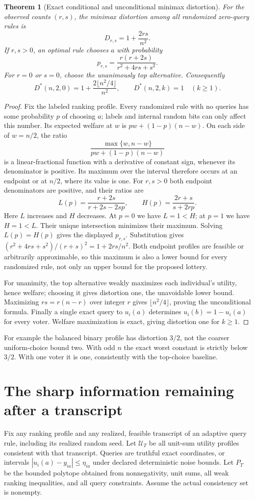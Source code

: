 \documentclass[11pt]{article}
\newtheorem{theorem}{Theorem}
\theoremstyle{remark}
\begin{document}
\begin{theorem}[Exact conditional and unconditional minimax distortion]
For the observed counts $(r,s)$, the minimax distortion among all
randomized zero-query rules is
\[
 D_{r,s}=1+\frac{2rs}{n^2}.
\]
If $r,s>0$, an optimal rule chooses $a$ with probability
\[
 p_{r,s}=\frac{r(r+2s)}{r^2+4rs+s^2}.
\]
For $r=0$ or $s=0$, choose the unanimously top alternative.
Consequently
\[
 D^*(n,2,0)=1+\frac{2\lfloor n^2/4\rfloor}{n^2},
 \qquad D^*(n,2,k)=1\quad(k\geq1).
\]
\end{theorem}
\begin{proof}
Fix the labeled ranking profile. Every randomized rule with no queries
has some probability $p$ of choosing $a$; labels and internal random
bits can only affect this number. Its expected welfare at $w$ is
$pw+(1-p)(n-w)$. On each side of $w=n/2$, the ratio
\[
 \frac{\max\{w,n-w\}}{pw+(1-p)(n-w)}
\]
is a linear-fractional function with a derivative of constant sign,
whenever its denominator is positive. Its maximum over the interval
therefore occurs at an endpoint or at $n/2$, where its value is one.
For $r,s>0$ both endpoint denominators are positive, and their ratios are
\[
 L(p)=\frac{r+2s}{r+2s-2sp},\qquad
 H(p)=\frac{2r+s}{s+2rp}.
\]
Here $L$ increases and $H$ decreases. At $p=0$ we have $L=1<H$;
at $p=1$ we have $H=1<L$. Their unique intersection minimizes their
maximum. Solving $L(p)=H(p)$ gives the displayed $p_{r,s}$.
Substitution gives $(r^2+4rs+s^2)/(r+s)^2=1+2rs/n^2$.
Both endpoint profiles are feasible or arbitrarily approximable, so
this maximum is also a lower bound for every randomized rule, not only
an upper bound for the proposed lottery.

For unanimity, the top alternative weakly maximizes each individual's
utility, hence welfare; choosing it gives distortion one, the unavoidable
lower bound. Maximizing $rs=r(n-r)$ over integer $r$ gives
$\lfloor n^2/4\rfloor$, proving the unconditional formula. Finally a
single exact query to $u_i(a)$ determines $u_i(b)=1-u_i(a)$ for every
voter. Welfare maximization is exact, giving distortion one for $k\geq1$.
\end{proof}

For example the balanced binary profile has distortion $3/2$, not the
coarser uniform-choice bound two. With odd $n$ the exact worst constant
is strictly below $3/2$. With one voter it is one, consistently with the
top-choice baseline.

\section{The sharp information remaining after a transcript}
Fix any ranking profile and any realized, feasible transcript of an
adaptive query rule, including its realized random seed. Let
$\mathcal U_T$ be all unit-sum utility profiles consistent with that
transcript. Queries are truthful exact coordinates, or intervals
$|u_i(a)-y_{ia}|\leq\eta_{ia}$ under declared deterministic noise bounds.
Let $P_T$ be the bounded polytope obtained from nonnegativity, unit sums,
all weak ranking inequalities, and all query constraints.
Assume the actual consistency set is nonempty.
\end{document}
